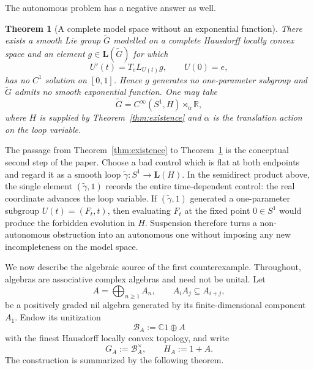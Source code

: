 \documentclass[11pt]{article}
\newtheorem{theorem}{Theorem}[section]
\theoremstyle{remark}
\begin{document}
The autonomous problem has a negative answer as well.

\begin{theorem}[A complete model space without an exponential function]
\label{thm:nonexponentiable}
There exists a smooth Lie group $\widetilde G$ modelled on a complete Hausdorff
locally convex space and an element $g\in\mathbf L(\widetilde G)$ for which
\[
  U'(t)=T_eL_{U(t)}g,
  \qquad U(0)=e,
\]
has no $C^1$ solution on $[0,1]$.  Hence $g$ generates no one-parameter
subgroup and $\widetilde G$ admits no smooth exponential function.  One may
take
\[
  \widetilde G=C^\infty(S^1,H)\rtimes_\alpha\mathbb R,
\]
where $H$ is supplied by Theorem~\ref{thm:existence} and $\alpha$ is the
translation action on the loop variable.
\end{theorem}

The passage from Theorem~\ref{thm:existence} to
Theorem~\ref{thm:nonexponentiable} is the conceptual second step of the
paper.  Choose a bad control which is flat at both endpoints and regard it as
a smooth loop $\widetilde\gamma:S^1\to\mathbf L(H)$.  In the semidirect
product above, the single element $(\widetilde\gamma,1)$ records the entire
time-dependent control: the real coordinate advances the loop variable.  If
$(\widetilde\gamma,1)$ generated a one-parameter subgroup
$U(t)=(F_t,t)$, then evaluating $F_t$ at the fixed point $0\in S^1$ would
produce the forbidden evolution in $H$.  Suspension therefore turns a
non-autonomous obstruction into an autonomous one without imposing any new
incompleteness on the model space.

We now describe the algebraic source of the first counterexample.  Throughout,
algebras are associative complex algebras and need not be unital.  Let
\[
  A=\bigoplus_{n\geq1}A_n,
  \qquad A_iA_j\subseteq A_{i+j},
\]
be a positively graded nil algebra generated by its finite-dimensional
component $A_1$.  Endow its unitization
\begin{equation}
  \mathcal B_A:=\mathbb C1\oplus A
  \label{eq:unitization}
\end{equation}
with the finest Hausdorff locally convex topology, and write
\[
  G_A:=\mathcal B_A^\times,
  \qquad
  H_A:=1+A.
\]
The construction is summarized by the following theorem.
\end{document}
